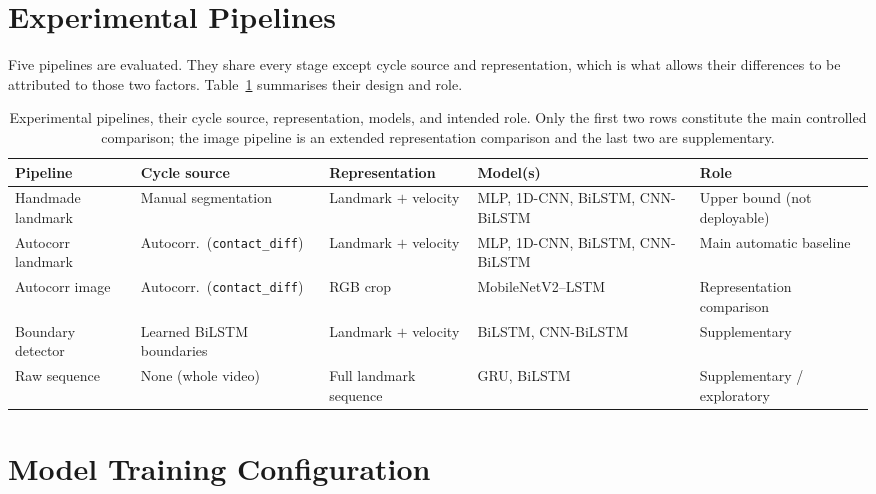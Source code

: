 \section{Experimental Pipelines}
\label{sec:setup-pipelines}

Five pipelines are evaluated. They share every stage except cycle source and
representation, which is what allows their differences to be attributed to those
two factors. Table~\ref{tab:pipelines} summarises their design and role.

\begin{table}[htbp]
\centering
\caption{Experimental pipelines, their cycle source, representation, models, and intended role. Only the first two rows constitute the main controlled comparison; the image pipeline is an extended representation comparison and the last two are supplementary.}
\label{tab:pipelines}
\renewcommand{\arraystretch}{1.3}
\footnotesize %

\begin{tabularx}{\textwidth}{l l X X X}
\toprule
Pipeline & Cycle source & Representation & Model(s) & Role \\
\midrule
Handmade landmark & Manual segmentation & Landmark $+$ velocity & MLP, 1D-CNN, BiLSTM, CNN-BiLSTM & Upper bound (not deployable) \\
\addlinespace
Autocorr landmark & Autocorr.\ (\texttt{contact\_diff}) & Landmark $+$ velocity & MLP, 1D-CNN, BiLSTM, CNN-BiLSTM & Main automatic baseline \\
\addlinespace
Autocorr image & Autocorr.\ (\texttt{contact\_diff}) & RGB crop & MobileNetV2--LSTM & Representation comparison \\
\addlinespace
Boundary detector & Learned BiLSTM boundaries & Landmark $+$ velocity & BiLSTM, CNN-BiLSTM & Supplementary \\
\addlinespace
Raw sequence & None (whole video) & Full landmark sequence & GRU, BiLSTM & Supplementary / exploratory \\
\bottomrule
\end{tabularx}
\end{table}


\section{Model Training Configuration}
\label{sec:setup-training}

